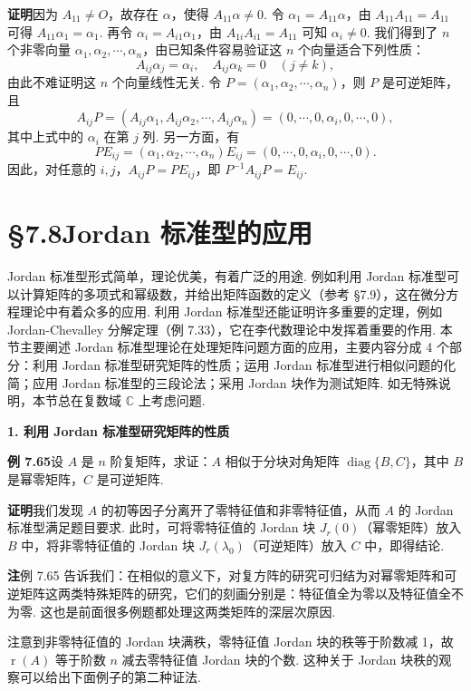 \documentclass[UTF8, 12pt, fontset=fandol, oneside]{ctexart}
\begin{document}
\noindent\textbf{证明}\quad 因为 $A_{11}\ne O$，故存在 $\alpha$，使得 $A_{11}\alpha\ne0$. 令 $\alpha_1=A_{11}\alpha$，由 $A_{11}A_{11}=A_{11}$ 可得 $A_{11}\alpha_1=\alpha_1$. 再令 $\alpha_i=A_{i1}\alpha_1$，由 $A_{1i}A_{i1}=A_{11}$ 可知 $\alpha_i\ne0$. 我们得到了 $n$ 个非零向量 $\alpha_1,\alpha_2,\cdots,\alpha_n$，由已知条件容易验证这 $n$ 个向量适合下列性质：
\[
A_{ij}\alpha_j=\alpha_i,\quad A_{ij}\alpha_k=0\quad (j\ne k),
\]
由此不难证明这 $n$ 个向量线性无关. 令 $P=(\alpha_1,\alpha_2,\cdots,\alpha_n)$，则 $P$ 是可逆矩阵，且
\[
A_{ij}P=(A_{ij}\alpha_1,A_{ij}\alpha_2,\cdots,A_{ij}\alpha_n)=(0,\cdots,0,\alpha_i,0,\cdots,0),
\]
其中上式中的 $\alpha_i$ 在第 $j$ 列. 另一方面，有
\[
PE_{ij}=(\alpha_1,\alpha_2,\cdots,\alpha_n)E_{ij}=(0,\cdots,0,\alpha_i,0,\cdots,0).
\]
因此，对任意的 $i,j$，$A_{ij}P=PE_{ij}$，即 $P^{-1}A_{ij}P=E_{ij}$.

\section*{§7.8\quad Jordan 标准型的应用}

Jordan 标准型形式简单，理论优美，有着广泛的用途. 例如利用 Jordan 标准型可以计算矩阵的多项式和幂级数，并给出矩阵函数的定义（参考 §7.9），这在微分方程理论中有着众多的应用. 利用 Jordan 标准型还能证明许多重要的定理，例如 Jordan-Chevalley 分解定理（例 7.33），它在李代数理论中发挥着重要的作用. 本节主要阐述 Jordan 标准型理论在处理矩阵问题方面的应用，主要内容分成 4 个部分：利用 Jordan 标准型研究矩阵的性质；运用 Jordan 标准型进行相似问题的化简；应用 Jordan 标准型的三段论法；采用 Jordan 块作为测试矩阵. 如无特殊说明，本节总在复数域 $\mathbb{C}$ 上考虑问题.

\noindent\textbf{1. 利用 Jordan 标准型研究矩阵的性质}

\noindent\textbf{例 7.65}\quad 设 $A$ 是 $n$ 阶复矩阵，求证：$A$ 相似于分块对角矩阵 $\operatorname{diag}\{B,C\}$，其中 $B$ 是幂零矩阵，$C$ 是可逆矩阵.

\noindent\textbf{证明}\quad 我们发现 $A$ 的初等因子分离开了零特征值和非零特征值，从而 $A$ 的 Jordan 标准型满足题目要求. 此时，可将零特征值的 Jordan 块 $J_r(0)$（幂零矩阵）放入 $B$ 中，将非零特征值的 Jordan 块 $J_r(\lambda_0)$（可逆矩阵）放入 $C$ 中，即得结论.

\noindent\textbf{注}\quad 例 7.65 告诉我们：在相似的意义下，对复方阵的研究可归结为对幂零矩阵和可逆矩阵这两类特殊矩阵的研究，它们的刻画分别是：特征值全为零以及特征值全不为零. 这也是前面很多例题都处理这两类矩阵的深层次原因.

注意到非零特征值的 Jordan 块满秩，零特征值 Jordan 块的秩等于阶数减 1，故 $\operatorname{r}(A)$ 等于阶数 $n$ 减去零特征值 Jordan 块的个数. 这种关于 Jordan 块秩的观察可以给出下面例子的第二种证法.
\end{document}
